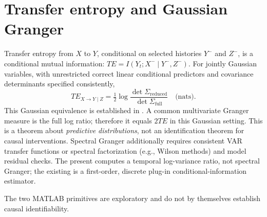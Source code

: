 \section{Transfer entropy and Gaussian Granger}
Transfer entropy from $X$ to $Y$, conditional on selected
histories $Y^-$ and $Z^-$, is a conditional mutual information:
$TE=I(Y_t;X^-\mid Y^-,Z^-)$.
For jointly Gaussian variables, with unrestricted correct
linear conditional predictors and covariance determinants
specified consistently,
\[
TE_{X\to Y\mid Z}=\tfrac12
\log\frac{\det\Sigma_{\mathrm{reduced}}}
                {\det\Sigma_{\mathrm{full}}}
\quad\text{(nats)}.
\]
This Gaussian equivalence is established in \cite{barnett2009}.
A common multivariate Granger measure is the full log ratio;
therefore it equals $2TE$ in this Gaussian setting.
This is a theorem about \emph{predictive distributions}, not an
identification theorem for causal interventions.
Spectral Granger additionally requires consistent VAR transfer
functions or spectral factorization (e.g., Wilson methods) and
model residual checks. The present
 computes a temporal
log-variance ratio, not spectral Granger; the existing
 is a first-order,
discrete plug-in conditional-information estimator.
\begin{caution}The two MATLAB primitives are exploratory and do not by themselves establish causal identifiability.\end{caution}